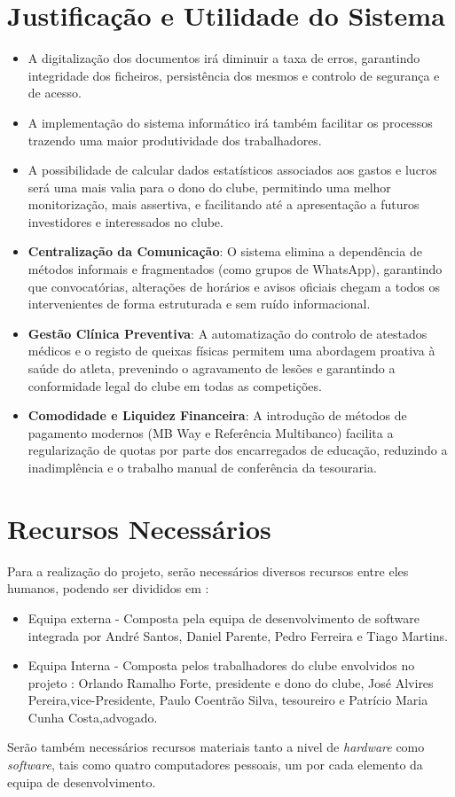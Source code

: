 \documentclass[a4paper,12pt]{scrreprt}
\begin{document}
\section{Justificação e Utilidade do Sistema}
\begin{itemize}
    \item A digitalização dos documentos irá diminuir a taxa de erros, garantindo integridade dos ficheiros, persistência dos mesmos e controlo de segurança e de acesso.
    \item A implementação do sistema informático irá também facilitar os processos trazendo uma maior produtividade dos trabalhadores.
    \item A possibilidade de calcular dados estatísticos associados aos gastos e lucros será uma mais valia para o dono do clube, permitindo uma melhor monitorização, mais assertiva, e facilitando até a apresentação a futuros investidores e interessados no clube.
    \item \textbf{Centralização da Comunicação}: O sistema elimina a dependência de métodos informais e fragmentados (como grupos de WhatsApp), garantindo que convocatórias, alterações de horários e avisos oficiais chegam a todos os intervenientes de forma estruturada e sem ruído informacional.
    \item \textbf{Gestão Clínica Preventiva}: A automatização do controlo de atestados médicos e o registo de queixas físicas permitem uma abordagem proativa à saúde do atleta, prevenindo o agravamento de lesões e garantindo a conformidade legal do clube em todas as competições.
    \item \textbf{Comodidade e Liquidez Financeira}: A introdução de métodos de pagamento modernos (MB Way e Referência Multibanco) facilita a regularização de quotas por parte dos encarregados de educação, reduzindo a inadimplência e o trabalho manual de conferência da tesouraria.
\end{itemize}
\section{Recursos Necessários}
    Para a realização do projeto, serão necessários diversos recursos entre eles humanos, podendo ser divididos em :
        \begin{itemize}
            \item Equipa externa - Composta pela equipa de desenvolvimento de software integrada por André Santos, Daniel Parente, Pedro Ferreira e Tiago Martins.
            \item Equipa Interna - Composta pelos trabalhadores do clube envolvidos no projeto : Orlando Ramalho Forte, presidente e dono do clube, José Alvires Pereira,vice-Presidente, Paulo Coentrão Silva, tesoureiro e Patrício Maria Cunha Costa,advogado.
        \end{itemize}
    Serão também necessários recursos materiais tanto a nivel de \textit{hardware} como \textit{software}, tais como quatro computadores pessoais, um por cada elemento da equipa de desenvolvimento.
\end{document}
